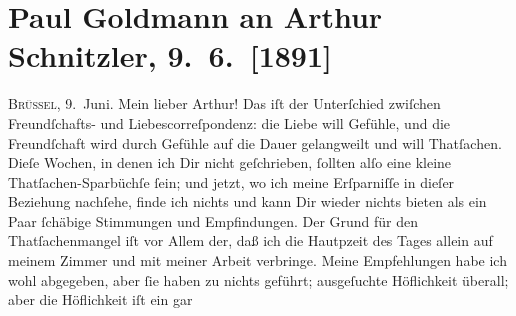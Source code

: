 

         
         \renewcommand{\erwaehntePersonen}{Personen:  ?? [Leiter einer Glasfabrik],  ?? [Schwester eines Glasfabrikanten], Richard Beer-Hofmann, Marie Glümer, Paul Goldmann, Clementine Goldmann, Hugo von Hofmannsthal, Jacob Jordaens, Friedrich Kapper, Fedor Mamroth, Peter Paul Rubens, Charles Tardieu, Boris Van-Jung, Richard Wagner, Olga Waissnix}
         \renewcommand{\erwaehnteInstitutionen}{Institutionen: ?? [Glasfabrik in Belgien], Frankfurter Zeitung, L’Indépendance Belge, Musées royaux des Beaux-Arts de Belgique}
         \renewcommand{\erwaehnteOrte}{Orte: Belgien, Brünn, Brüssel, Frankfurt am Main, Niederlande, Spanien, Wien, rue des Plantes}
         \renewcommand{\erwaehnteWerke}{}
               \section[Paul Goldmann an Arthur Schnitzler, 9. 6. {[}1891{]}]{ Paul Goldmann an Arthur Schnitzler, 9. 6. {[}1891{]}}\nopagebreak{}\rehead{ }\begin{ledgroupsized}[t]{13cm}\normalsize\beginnumbering \toendnotes[C]{\smallbreak\pagebreak[2]} 
\toendnotes[C]{\smallbreak}\pstart
           \raggedleft{}{\pb}\textsc{Brüssel}, 9. Juni.\pend
           \pstart\center{}Mein lieber Arthur!\pend\pstart
           Das iſt der Unterſchied zwiſchen Freundſchafts- und Liebescorreſpondenz: die Liebe
               will Gefühle, und die Freundſchaft wird durch Gefühle auf die Dauer gelangweilt und
               will Thatſachen. Dieſe Wochen, in denen ich Dir nicht geſchrieben, ſollten alſo eine
               kleine Thatſachen-Sparbüchſe ſein; und jetzt, wo ich meine Erſparniſſe in dieſer
               Beziehung nachſehe, finde ich nichts und kann Dir wieder nichts bieten als ein Paar
               ſchäbige Stimmungen und Empfindungen. Der Grund für den Thatſachenmangel iſt vor
               Allem der, daß ich die Hautpzeit des Tages allein auf meinem Zimmer und mit meiner
               Arbeit verbringe. Meine Empfehlungen habe ich wohl abgegeben, aber ſie haben zu
               nichts geführt; ausgeſuchte Höflichkeit überall; aber die Höflichkeit iſt ein gar

\end{ledgroupsized}

